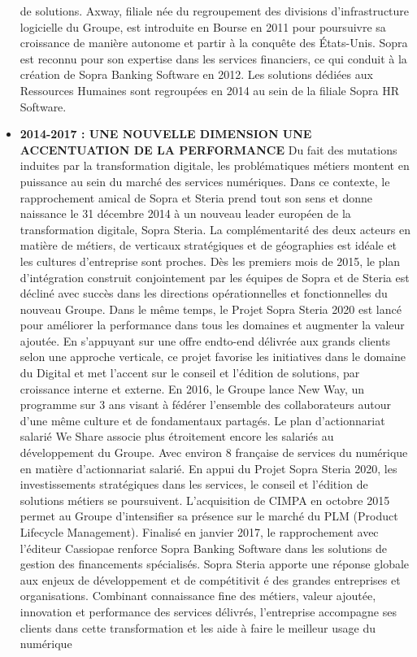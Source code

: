 \begin{itemize}
de solutions. Axway, filiale née du regroupement des divisions d'infrastructure logicielle
du Groupe, est introduite en Bourse en 2011 pour poursuivre sa croissance de manière
autonome et partir à la conquête des États-Unis. Sopra est reconnu pour son expertise
dans les services financiers, ce qui conduit à la création de Sopra Banking Software en
2012. Les solutions dédiées aux Ressources Humaines sont regroupées en 2014 au sein de
la filiale Sopra HR Software.
\item \textbf{2014-2017 : UNE NOUVELLE DIMENSION UNE ACCENTUATION DE LA
	PERFORMANCE }Du fait des mutations induites par la transformation digitale, les
problématiques métiers montent en puissance au sein du marché des services numériques.
Dans ce contexte, le rapprochement amical de Sopra et Steria prend tout son sens et donne
naissance le 31 décembre 2014 à un nouveau leader européen de la transformation digitale,
Sopra Steria. La complémentarité des deux acteurs en matière de métiers, de verticaux
stratégiques et de géographies est idéale et les cultures d'entreprise sont proches. Dès les
premiers mois de 2015, le plan d'intégration construit conjointement par les équipes de
Sopra et de Steria est décliné avec succès dans les directions opérationnelles et fonctionnelles
du nouveau Groupe. Dans le même temps, le Projet Sopra Steria 2020 est lancé
pour améliorer la performance dans tous les domaines et augmenter la valeur ajoutée.
En s'appuyant sur une offre endto-end délivrée aux grands clients selon une approche
verticale, ce projet favorise les initiatives dans le domaine du Digital et met l'accent sur
le conseil et l'édition de solutions, par croissance interne et externe. En 2016, le Groupe
lance New Way, un programme sur 3 ans visant à fédérer l'ensemble des collaborateurs
autour d'une même culture et de fondamentaux partagés. Le plan d'actionnariat salarié
We Share associe plus étroitement encore les salariés au développement du Groupe. Avec
environ 8%
française de services du numérique en matière d'actionnariat salarié. En appui du
Projet Sopra Steria 2020, les investissements stratégiques dans les services, le conseil et
l'édition de solutions métiers se poursuivent. L'acquisition de CIMPA en octobre 2015
permet au Groupe d'intensifier sa présence sur le marché du PLM (Product Lifecycle
Management). Finalisé en janvier 2017, le rapprochement avec l'éditeur Cassiopae renforce
Sopra Banking Software dans les solutions de gestion des financements spécialisés.
Sopra Steria apporte une réponse globale aux enjeux de développement et de compétitivit
é des grandes entreprises et organisations. Combinant connaissance fine des métiers,
valeur ajoutée, innovation et performance des services délivrés, l'entreprise accompagne
ses clients dans cette transformation et les aide à faire le meilleur usage du numérique
\end{itemize}

